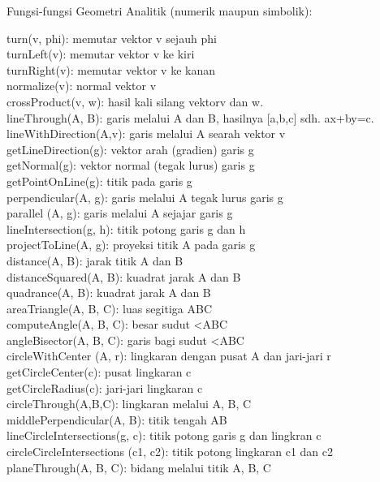 \documentclass[
]{book}
\begin{document}
Fungsi-fungsi Geometri Analitik (numerik maupun simbolik):

turn(v, phi): memutar vektor v sejauh phi\\
turnLeft(v): memutar vektor v ke kiri\\
turnRight(v): memutar vektor v ke kanan\\
normalize(v): normal vektor v\\
crossProduct(v, w): hasil kali silang vektorv dan w.\\
lineThrough(A, B): garis melalui A dan B, hasilnya {[}a,b,c{]} sdh. ax+by=c.\\
lineWithDirection(A,v): garis melalui A searah vektor v\\
getLineDirection(g): vektor arah (gradien) garis g\\
getNormal(g): vektor normal (tegak lurus) garis g\\
getPointOnLine(g): titik pada garis g\\
perpendicular(A, g): garis melalui A tegak lurus garis g\\
parallel (A, g): garis melalui A sejajar garis g\\
lineIntersection(g, h): titik potong garis g dan h\\
projectToLine(A, g): proyeksi titik A pada garis g\\
distance(A, B): jarak titik A dan B\\
distanceSquared(A, B): kuadrat jarak A dan B\\
quadrance(A, B): kuadrat jarak A dan B\\
areaTriangle(A, B, C): luas segitiga ABC\\
computeAngle(A, B, C): besar sudut \textless ABC\\
angleBisector(A, B, C): garis bagi sudut \textless ABC\\
circleWithCenter (A, r): lingkaran dengan pusat A dan jari-jari r\\
getCircleCenter(c): pusat lingkaran c\\
getCircleRadius(c): jari-jari lingkaran c\\
circleThrough(A,B,C): lingkaran melalui A, B, C\\
middlePerpendicular(A, B): titik tengah AB\\
lineCircleIntersections(g, c): titik potong garis g dan lingkran c\\
circleCircleIntersections (c1, c2): titik potong lingkaran c1 dan c2\\
planeThrough(A, B, C): bidang melalui titik A, B, C
\end{document}
